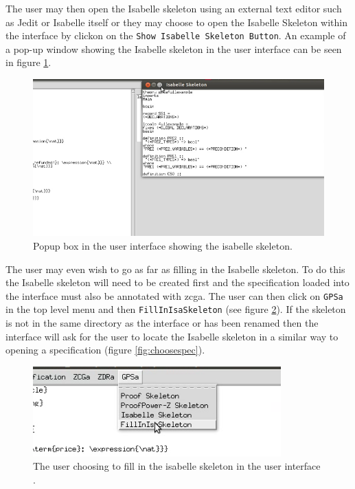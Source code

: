 The user may then open the Isabelle skeleton using an external text editor such
as Jedit or Isabelle itself or they may choose to open the Isabelle Skeleton
within the interface by clickon on the \texttt{Show Isabelle Skeleton Button}.
An example of a pop-up window showing the Isabelle skeleton in the user
interface can be seen in figure \ref{fig:isaskelpopup}.

\begin{figure}[H]
\centering
\includegraphics[scale=0.5]{Figures/Interface/isaskelpopup.png}
\caption{Popup box in the user interface showing the isabelle skeleton. \label{fig:isaskelpopup}}
\end{figure}

The user may even wish to go as far as filling in the Isabelle skeleton. To do
this the Isabelle skeleton will need to be created first and the specification
loaded into the interface must also be annotated with \gls{zcga}. The user can
then click on \texttt{GPSa} in the top level menu and then
\texttt{FillInIsaSkeleton} (see figure \ref{fig:fillinisaskel}). If the skeleton
is not in the same directory as the interface or has been renamed then the
interface will ask for the user to locate the Isabelle skeleton in a similar way
to opening a specification (figure \ref{fig:choosespec}).

\begin{figure}[H]
\centering
\includegraphics[scale=0.5]{Figures/Interface/fillinisaskel.png}
\caption{The user choosing to fill in the isabelle skeleton in the user interface . \label{fig:fillinisaskel}}
\end{figure}

